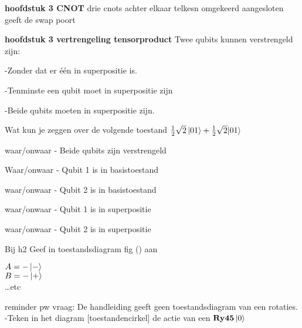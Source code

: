 \documentclass[a4paper, addpoints, 12pt
    , noanswers    %
    ]{exam}
\newcommand*{\port}[1]{\textbf{#1}}
\begin{document}
\begin{questions}


\textbf{hoofdstuk 3 CNOT
}drie cnots achter elkaar telkesn omgekeerd aangesloten geeft de swap poort

\textbf{hoofdstuk 3 vertrengeling tensorproduct}
Twee qubits kunnen verstrengeld zijn:

-Zonder dat er \'e\'en in superpositie is.

-Tenminste een qubit moet in superpositie zijn

-Beide qubits moeten in superpositie zijn.

Wat kun je zeggen over de volgende toestand
$\tfrac{1}{2}\sqrt{2}\ket{01}+\tfrac{1}{2}\sqrt{2}{\ket{01}}$

waar/onwaar - Beide qubits zijn verstrengeld

Waar/onwaar - Qubit 1 is in basistoestand

waar/onwaar - Qubit 2 is in basistoestand

waar/onwaar - Qubit 1 is in superpositie

waar/onwaar - Qubit 2 is in superpositie


Bij h2 Geef in toestandsdiagram fig ()  aan 

$A = -\ket{-}$\\
$B = -\ket{+}$\\
\ldots etc


reminder pw vraag: De handleiding geeft geen toestandsdiagram van een rotaties. 
-Teken in het diagram [toestandencirkel] de actie van een $\port{Ry45}\ket{0} $



\end{questions}
\end{document}
